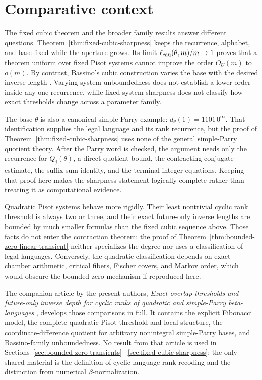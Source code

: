 \section{Comparative context}
\label{sec:comparative-context}

The fixed cubic theorem and the broader family results answer different
questions.  Theorem~\ref{thm:fixed-cubic-sharpness} keeps the recurrence,
alphabet, and base fixed while the aperture grows.  Its limit
$\ell_{\rm cau}(\theta,m)/m\to1$ proves that a theorem uniform over fixed
Pisot systems cannot improve the order $O_U(m)$ to $o(m)$.  By contrast,
Bassino's cubic construction varies the base with the desired inverse
length \cite{Bassino2002}.  Varying-system unboundedness does not establish a
lower order inside any one recurrence, while fixed-system sharpness does not
classify how exact thresholds change across a parameter family.

The base $\theta$ is also a canonical simple-Parry example:
$d_\theta(1)=1101\,0^\infty$.  That identification supplies the legal
language and its rank recurrence, but the proof of
Theorem~\ref{thm:fixed-cubic-sharpness} uses none of the general
simple-Parry quotient theory.  After the Parry word is checked, the argument
needs only the recurrence for $Q_j(\theta)$, a direct quotient bound, the
contracting-conjugate estimate, the suffix-sum identity, and the terminal
integer equations.  Keeping that proof here makes the sharpness statement
logically complete rather than treating it as computational evidence.

Quadratic Pisot systems behave more rigidly.  Their least nontrivial cyclic
rank threshold is always two or three, and their exact future-only inverse
lengths are bounded by much smaller formulas than the fixed cubic sequence
above.  Those facts do not enter the contraction theorem: the proof of
Theorem~\ref{thm:bounded-zero-linear-transient} neither specializes the
degree nor uses a classification of legal languages.  Conversely, the
quadratic classification depends on exact chamber arithmetic, critical
fibers, Fischer covers, and Markov order, which would obscure the
bounded-zero mechanism if reproduced here.

The companion article by the present authors, \emph{Exact overlap thresholds
and future-only inverse depth for cyclic ranks of quadratic and simple-Parry
beta-languages} \cite{MaZhang2026ExactOverlap}, develops those comparisons in
full.  It contains the
explicit Fibonacci model, the complete quadratic-Pisot threshold and local
structure, the coordinate-difference quotient for arbitrary nonintegral
simple-Parry bases, and Bassino-family unboundedness.  No result from that
article is used in Sections~\ref{sec:bounded-zero-transients}--
\ref{sec:fixed-cubic-sharpness}; the only shared material is the definition
of cyclic language-rank recoding and the distinction from numerical
$\beta$-normalization.

